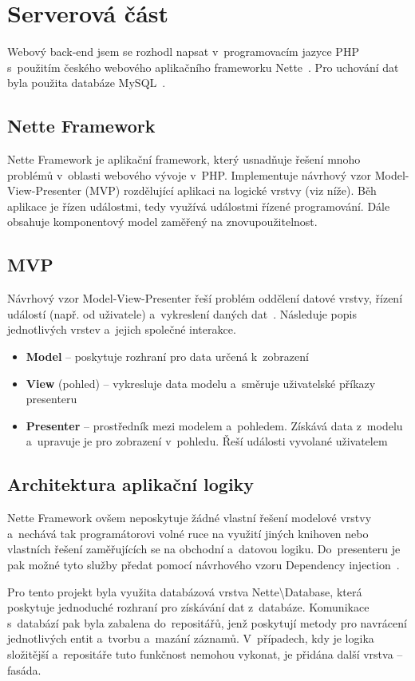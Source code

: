 \documentclass[11pt,twoside,a4paper]{book}
\newcommand*{\nomExpl}[2]{#2 (#1)\nomenclature{#1}{#2}} 	%
\begin{document}
\section{Serverová část}
Webový back-end jsem se rozhodl napsat v~programovacím jazyce PHP s~použitím českého webového aplikačního frameworku Nette~\cite{nette}. Pro uchování dat byla použita databáze MySQL~\cite{mysql}.

\subsection{Nette Framework}
Nette Framework je aplikační framework, který usnadňuje řešení mnoho problémů v~oblasti webového vývoje v~PHP. Imple\-mentuje návrhový vzor \nomExpl{MVP}{Model-View-Presenter} rozdělující aplikaci na logické vrstvy (viz níže). Běh aplikace je řízen událostmi, tedy využívá událostmi řízené programování. Dále obsahuje komponentový model zaměřený na znovupoužitelnost.

\subsection{MVP}
Návrhový vzor Model-View-Presenter řeší problém oddělení datové vrstvy, řízení událostí (např. od uživatele) a~vykreslení daných dat~\cite{mvp}. Následuje popis jednotlivých vrstev a~jejich společné interakce.

\begin{itemize}
	\item \textbf{Model} – poskytuje rozhraní pro data určená k~zobrazení
	\item \textbf{View} (pohled) – vykresluje data modelu a~směruje uživatelské příkazy presenteru
	\item \textbf{Presenter} – prostředník mezi modelem a~pohledem. Získává data z~modelu a~upravuje je pro zobrazení v~pohledu. Řeší události vyvolané uživatelem
\end{itemize}

\subsection{Architektura aplikační logiky}
Nette Framework ovšem neposkytuje žádné vlastní řešení modelové vrstvy a~nechává tak programátorovi volné ruce na využití jiných knihoven nebo vlastních řešení zaměřujících se na obchodní a~datovou logiku. Do~presenteru je pak možné tyto služby předat pomocí návrhového vzoru Dependency injection~\cite{di}.

Pro tento projekt byla využita databázová vrstva Nette\textbackslash{}Database, která poskytuje jednoduché rozhraní pro získávání dat z~databáze. Komunikace s~databází pak byla zabalena do~repositářů, jenž poskytují metody pro navrácení jednotlivých entit a~tvorbu a~mazání záznamů. V~případech, kdy je logika složitější a~repositáře tuto funkčnost nemohou vykonat, je přidána další vrstva – fasáda. 
\end{document}
